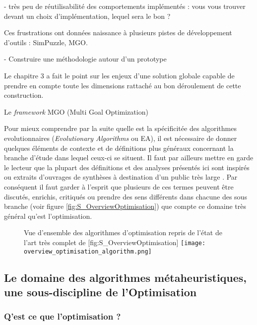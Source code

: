   - très peu de réutilisabilité des comportements implémentés : vous vous trouver devant un choix d'implémentation, lequel sera le bon ?


Ces frustrations ont données naissance à plusieurs pistes de développement d'outils : SimPuzzle, MGO.


- Construire une méthodologie autour d'un prototype






Le chapitre 3 a fait le point sur les enjeux d'une solution globale capable de prendre en compte toute les dimensions rattaché au bon déroulement de cette construction.

Le \textit{framework} MGO (Multi Goal Optimization)

Pour mieux comprendre par la suite quelle est la spécificitée des algorithmes evolutionnaires (\textit{Evolutionary Algorithms} ou EA), il est nécessaire de donner quelques éléments de contexte et de définitions plus généraux concernant la branche d'étude dans lequel ceux-ci se situent. Il faut par ailleurs mettre en garde le lecteur que la plupart des définitions et des analyses présentés ici sont inspirés ou extraits d'ouvrages de synthèses à destination d'un public très large \autocites{Weise2011, Luke2013, Brownlee2012}. Par conséquent il faut garder à l'esprit que plusieurs de ces termes peuvent être discutés, enrichis, critiqués ou prendre des sens différents dans chacune des sous branche (voir figure \ref{fig:S_OverviewOptimisation}) que compte ce domaine très général qu'est l'optimisation.

\begin{figure}[h]
\begin{sidecaption}[fortoc]{ Vue d'ensemble des algorithmes d'optimisation repris de l'état de l'art très complet de \textcite[32]{Weise2011}}[fig:S_OverviewOptimisation]
  \centering
 \texttt{[image: overview\_optimisation\_algorithm.png]}
  \end{sidecaption}
\end{figure}

\subsection{Le domaine des algorithmes métaheuristiques, une sous-discipline de l'Optimisation}

\subsubsection{Q'est ce que l'optimisation ?}
\label{sssec:Optimisation}

